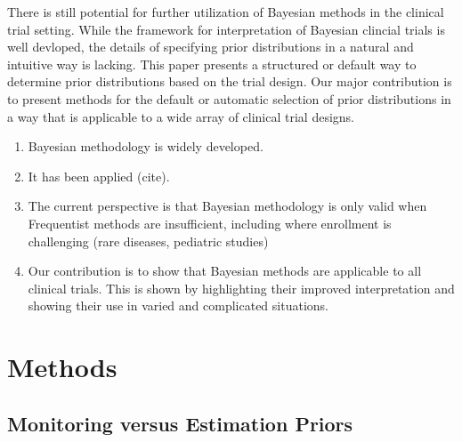 \documentclass[12pt]{article}
\begin{document}
There is still potential for further utilization of Bayesian methods in the clinical trial setting. While the framework for interpretation of Bayesian clincial trials is well devloped, the details of specifying prior distributions in a natural and intuitive way is lacking. This paper presents a structured or default way to determine prior distributions based on the trial design. Our major contribution is to present methods for the default or automatic selection of prior distributions in a way that is applicable to a wide array of clinical trial designs.

\begin{enumerate}
\item Bayesian methodology is widely developed.
\item It has been applied (cite).
\item The current perspective is that Bayesian methodology is only valid when Frequentist methods are insufficient, including where enrollment is challenging (rare diseases, pediatric studies)
\item Our contribution is to show that Bayesian methods are applicable to all clinical trials. This is shown by highlighting their improved interpretation and showing their use in varied and complicated situations.
\end{enumerate}

\section{Methods}
\subsection{Monitoring versus Estimation Priors}

\end{document}
